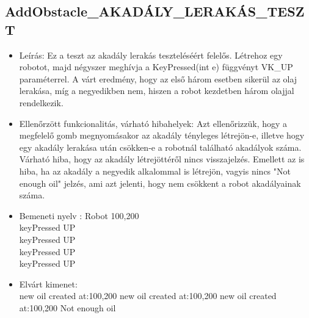 \subsection{AddObstacle\_AKADÁLY\_LERAKÁS\_TESZT}
\begin{itemize}
	\item Leírás: Ez a teszt az akadály lerakás teszteléséért felelős. Létrehoz egy robotot, majd négyszer meghívja a KeyPressed(int e) függvényt VK\_UP paraméterrel.
A várt eredmény, hogy az első három esetben sikerül az olaj lerakása, míg a negyedikben nem, hiszen a robot kezdetben három olajjal rendelkezik.
\newline
	\item Ellenőrzött funkcionalitás, várható hibahelyek: Azt ellenőrizzük, hogy a megfelelő gomb megnyomásakor az akadály tényleges létrejön-e, illetve hogy egy akadály lerakása után csökken-e a robotnál található akadályok száma. Várható hiba, hogy az akadály létrejöttéről nincs visszajelzés. Emellett az is hiba, ha az akadály a negyedik alkalommal is létrejön, vagyis nincs "Not enough oil" jelzés, ami azt jelenti, hogy nem csökkent a robot akadályainak száma.
	\item Bemeneti nyelv :\newline
		Robot 100,200\\
        keyPressed UP\\ 
        keyPressed UP\\
		keyPressed UP\\
		keyPressed UP\\
		
	\item Elvárt kimenet: \\
	    new oil created at:100,200\newline
		new oil created at:100,200\newline
		new oil created at:100,200\newline
		Not enough oil\newline
		
\end{itemize}

